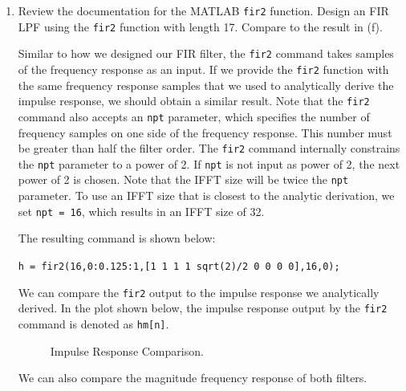 \documentclass[fleqn]{article}
\begin{document}
\begin{enumerate}
\begin{enumerate}[nolistsep]
			\item Review the documentation for the MATLAB \texttt{fir2} function. Design an FIR LPF using the \texttt{fir2} function with length 17. Compare to the result in (f).
			
			Similar to how we designed our FIR filter, the \texttt{fir2} command takes samples of the frequency response as an input. If we provide the \texttt{fir2} function with the same frequency response samples that we used to analytically derive the impulse response, we should obtain a similar result. Note that the \texttt{fir2} command also accepts an \texttt{npt} parameter, which specifies the number of frequency samples on one side of the frequency response. This number must be greater than half the filter order. The \texttt{fir2} command internally constrains the \texttt{npt} parameter to a power of 2. If \texttt{npt} is not input as power of 2, the next power of 2 is chosen. Note that the IFFT size will be twice the \texttt{npt} parameter. To use an IFFT size that is closest to the analytic derivation, we set \texttt{npt = 16}, which results in an IFFT size of 32.
			
			The resulting command is shown below:
			
			\texttt{h = fir2(16,0:0.125:1,[1 1 1 1 sqrt(2)/2 0 0 0 0],16,0);}
			
			We can compare the \texttt{fir2} output to the impulse response we analytically derived. In the plot shown below, the impulse response output by the \texttt{fir2} command is denoted as \texttt{hm[n]}.
			
			\begin{figure}[H]
				\centerline{}
				\caption{Impulse Response Comparison.}
			\end{figure}
			
			We can also compare the magnitude frequency response of both filters.
			

\end{enumerate}
\end{enumerate}
\end{document}
